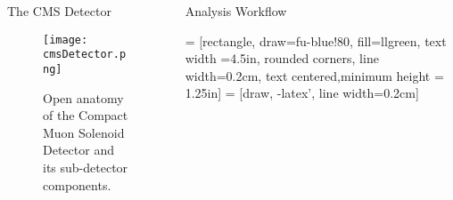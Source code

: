 \documentclass[final]{beamer}
\newlength{\onecolwid}
\newlength{\twocolwid}
\begin{document}
\begin{frame}[t]
\begin{columns}[t]
\begin{column}{\twocolwid}
\begin{columns}[t,totalwidth=\twocolwid]
\begin{column}{\onecolwid}
\begin{block}{The CMS Detector}
\begin{figure}[H]
  \centering
  \texttt{[image: cmsDetector.png]}
  \caption{Open anatomy of the  Compact Muon Solenoid Detector and its sub-detector components.}
\end{figure}


\end{block}


\end{column} %

\begin{column}{\onecolwid}\vspace{-.6in} %


\begin{block}{Analysis Workflow}

 = [rectangle, draw=fu-blue!80, fill=llgreen, text width
=4.5in, rounded corners, line width=0.2cm, text centered,minimum height = 1.25in]
 = [draw, -latex', line width=0.2cm]

\begin{center}
\end{center} 


\end{block}
\end{column}
\end{columns}
\end{column}
\end{columns}
\end{frame}
\end{document}
